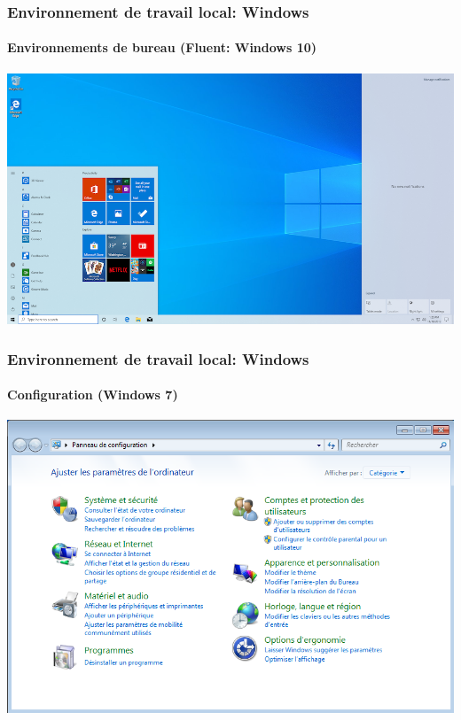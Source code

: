 \documentclass[xcolor=table]{beamer}
\begin{document}
\begin{frame}
\frametitle{Environnement de travail local: Windows}
\framesubtitle{Environnements de bureau (Fluent: Windows 10)}

\begin{center}
	\includegraphics[height=
	.8\textheight]{../img/Bweb01-environnement/win10.png}
\end{center}

\end{frame}

\begin{frame}
\frametitle{Environnement de travail local: Windows}
\framesubtitle{Configuration (Windows 7)}

\begin{center}
	\includegraphics[height=
	.8\textheight]{../img/Bweb01-environnement/win7-config.png}
\end{center}

\end{frame}
\end{document}

